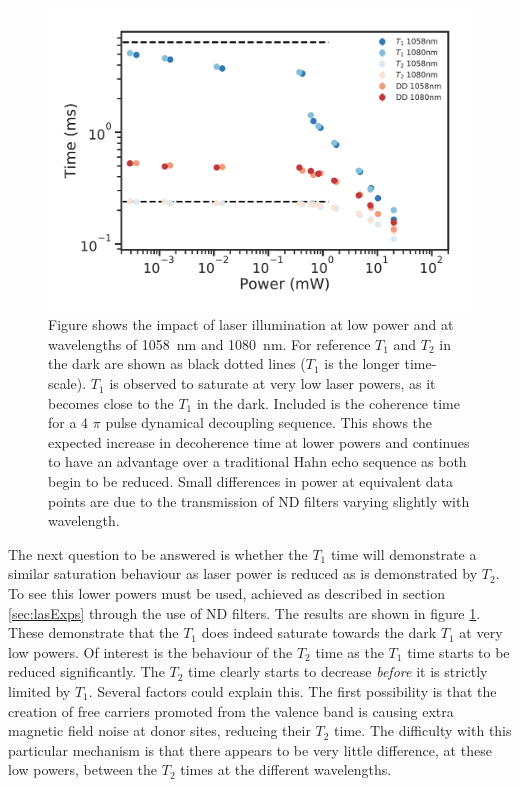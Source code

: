 \begin{figure}
\centering
\includegraphics[width=0.8\columnwidth]{Figures/T1vsT2vsDD1058and1080.pdf}
\caption[Low power $T_1$ and $T_2$ comparison]{Figure shows the impact of laser illumination at low power and at wavelengths of 1058~nm and 1080~nm. For reference $T_1$ and $T_2$ in the dark are shown as black dotted lines ($T_1$ is the longer time-scale). $T_1$ is observed to saturate at very low laser powers, as it becomes close to the $T_1$ in the dark. Included is the coherence time for a 4 $\pi$ pulse dynamical decoupling sequence. This shows the expected increase in decoherence time at lower powers and continues to have an advantage over a traditional Hahn echo sequence as both begin to be reduced. Small differences in power at equivalent data points are due to the transmission of ND filters varying slightly with wavelength.}
\label{fig:t1vst2lowpow}
\end{figure}
The next question to be answered is whether the $T_1$ time will demonstrate a similar saturation behaviour as laser power is reduced as is demonstrated by $T_2$.
To see this lower powers must be used, achieved as described in section \ref{sec:lasExps} through the use of ND filters.
The results are shown in figure \ref{fig:t1vst2lowpow}.
These demonstrate that the $T_1$ does indeed saturate towards the dark $T_1$ at very low powers.
Of interest is the behaviour of the $T_2$ time as the $T_1$ time starts to be reduced significantly.
The $T_2$ time clearly starts to decrease \textit{before} it is strictly limited by $T_1$.
Several factors could explain this.
The first possibility is that the creation of free carriers promoted from the valence band is causing extra magnetic field noise at donor sites, reducing their $T_2$ time.
The difficulty with this particular mechanism is that there appears to be very little difference, at these low powers, between the $T_2$ times at the different wavelengths. 
